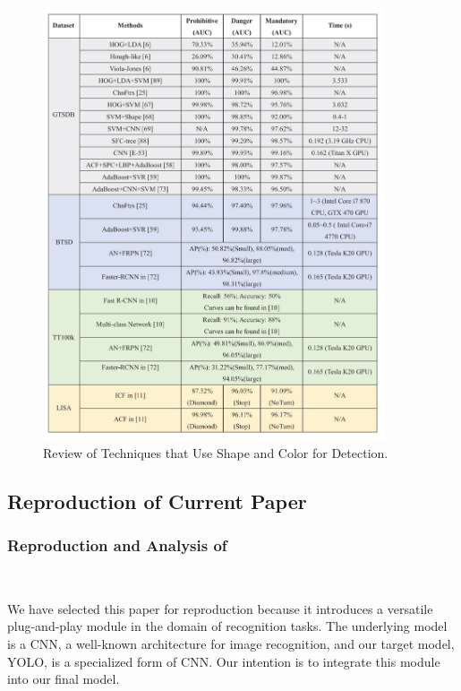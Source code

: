 \documentclass[letterpaper, 10 pt, conference]{ieeeconf}
\begin{document}
\begin{figure}[!t]
    \centering
    \includegraphics[width=0.9\textwidth]{figures/comparasion.jpg} 
    \caption{Review of Techniques that Use Shape and Color for Detection.}
    \label{fig:comparasion}
\end{figure}

\subsection{Reproduction of Current Paper}

\subsubsection{Reproduction and Analysis of \cite{arcos2018deep}}\

We have selected this paper for reproduction because it introduces a versatile plug-and-play module in the domain of recognition tasks. The underlying model is a CNN, a well-known architecture for image recognition, and our target model, YOLO, is a specialized form of CNN. Our intention is to integrate this module into our final model.
\end{document}
